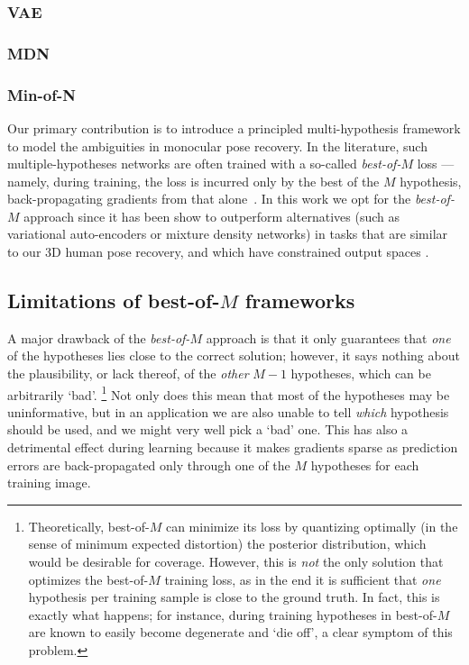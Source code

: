 \subsubsection{VAE}
\subsubsection{MDN}
\subsubsection{Min-of-N}

Our primary contribution is to introduce a principled multi-hypothesis framework to model the ambiguities in monocular pose recovery.
In the literature, such multiple-hypotheses networks are often trained with a so-called \emph{best-of-$M$} loss --- namely, during training, the loss is incurred only by the best of the $M$ hypothesis, back-propagating gradients from that alone~\cite{guzman2012multiple}.
In this work we opt for the \emph{best-of-$M$} approach since it has been show to outperform  alternatives (such as variational auto-encoders or mixture density networks) in tasks that are similar to our 3D human pose recovery, and which have constrained output spaces \cite{rupprecht17learning}.



\subsection{Limitations of best-of-$M$ frameworks}

A major drawback of the \emph{best-of-$M$} approach is that it only guarantees that \emph{one} of the hypotheses lies close to the correct solution; however, it says nothing about the plausibility, or lack thereof, of the \emph{other} $M-1$ hypotheses, which can be arbitrarily `bad'.%
%
\footnote{
Theoretically, best-of-$M$ can minimize its loss by quantizing optimally (in the sense of minimum expected distortion) the posterior distribution, which would be desirable for coverage.
However, this is \emph{not} the only solution that optimizes the best-of-$M$ training loss, as in the end it is sufficient that \emph{one} hypothesis per training sample is close to the ground truth.
In fact, this is exactly what happens; for instance, during training hypotheses in best-of-$M$ are known to easily become degenerate and `die off', a clear symptom of this problem.
}
%
Not only does this mean that most of the hypotheses may be uninformative, but in an application we are also unable to tell \emph{which} hypothesis should be used, and we might very well pick a `bad'
one.
This has also a detrimental effect during learning because it  makes gradients sparse as prediction errors are back-propagated only through one of the $M$ hypotheses for each training image.

